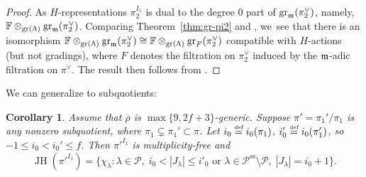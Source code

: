 \documentclass[JEP,XML,SOM,Unicode,NoFloatCountersInSection, NoEqCountersInSection,published]{cedram}
\newcommand{\defeq}{\stackrel{\textrm{\tiny{\upshape{def}}}}{=}}
\newcommand{\F}{\mathbb{F}}
\renewcommand{\P}{\mathscr P}
\renewcommand{\ss}{\mathrm{ss}}
\newcommand{\brho}{\overline{\rho}}
\DeclareMathOperator{\gr}{gr}
\DeclareMathOperator{\JH}{\mathrm{JH}}
\theoremstyle{plain}
\newtheorem{cor}[prop]{Corollary}
\theoremstyle{definition}
\begin{document}
\begin{proof}
As $H$-representations $\pi_2^{I_1}$ is dual to the degree $0$ part of $\gr_{\m}(\pi_2^{\vee})$, namely, $\F\otimes_{\gr(\Lambda)}\gr_{\m}(\pi_2^{\vee})$. Comparing Theorem~\ref{thm:gr-pi2} and \cite[Cor.\,4.4.5]{BHHMS4}, we~see that there is an isomorphism $\F\otimes_{\gr(\Lambda)}\gr_{\m}(\pi_2^{\vee})\cong \F\otimes_{\gr(\Lambda)}\gr_F(\pi_2^{\vee})$ compatible with $H$\nobreakdash-actions (but not gradings), where $F$ denotes the filtration on $\pi_2^{\vee}$ induced by the $\mathfrak{m}$-adic filtration on $\pi^{\vee}$. The result then follows from \cite[Cor.\,4.4.7]{BHHMS4}.
\end{proof}

\pagebreak[2]
We can generalize to subquotients:

\begin{cor}\label{cor:subquot-I1-invt}
{Assume that $\brho$ is $\max\{9,2f+3\}$-generic.}
Suppose $\pi' = \pi_1'/\pi_1$ is any nonzero subquotient, where $\pi_1 \subsetneq \pi_1' \subset \pi$.
Let $i_0 \defeq i_0(\pi_1)$, $i_0' \defeq i_0(\pi_1')$, so~$-1 \le i_0 < i_0' \le f$.
Then $\pi'^{I_1}$ is multiplicity-free and
\begin{equation*}
\JH(\pi'^{I_1}) = \{ \chi_\lambda: \text{$\lambda \in \P,\; i_0 < |J_\lambda| \le i'_0$ or $\lambda \in \P^\ss \setminus \P,\; |J_\lambda| = i_0+1$} \}.
\end{equation*}
\end{cor}
\end{document}
